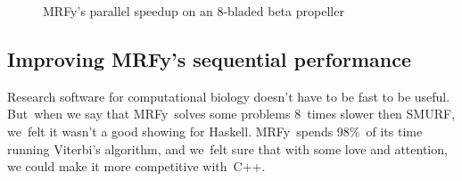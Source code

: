 \documentclass[]{jfp1}
\newcommand\mrfy{MRFy} %
\newcommand\figlabel[1]{\label{fig:#1}}
\newcommand\seclabel[1]{\label{sec:#1}}
\begin{document}


\begin{figure}%
\centerline{}
\medskip
\caption{\mrfy's parallel speedup on an 8-bladed beta propeller}
\figlabel{speedup}
\end{figure}

%


\subsection{Improving \mrfy's sequential performance}

\seclabel{better-viterbi}
\seclabel{improving-viterbi}

Research software for
computational biology doesn't have to be fast to be useful.
But~when we say that \mrfy\ solves some problems 8~times slower then
SMURF, we~felt it wasn't a good showing for Haskell.
\mrfy\ spends 98\%\ of its time running Viterbi's algorithm, and
we~felt sure that with some love and attention, we could make it
more competitive with~C++.
\end{document}
